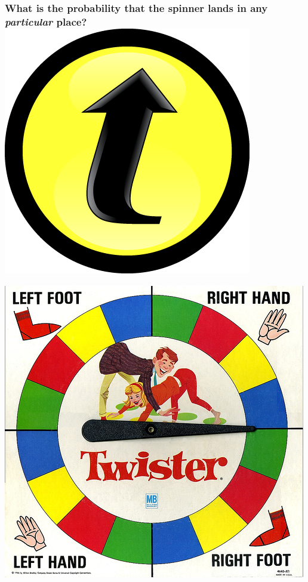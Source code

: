 \documentclass[handout]{beamer}
\begin{document}
\begin{frame}
\frametitle{What is the probability that the spinner lands in any \emph{particular} place?\hfill \includegraphics[scale = 0.05]{./images/clicker}}

\begin{center}
	\includegraphics[scale = 0.6]{./images/twister}
\end{center}
\end{frame}
\end{document}
